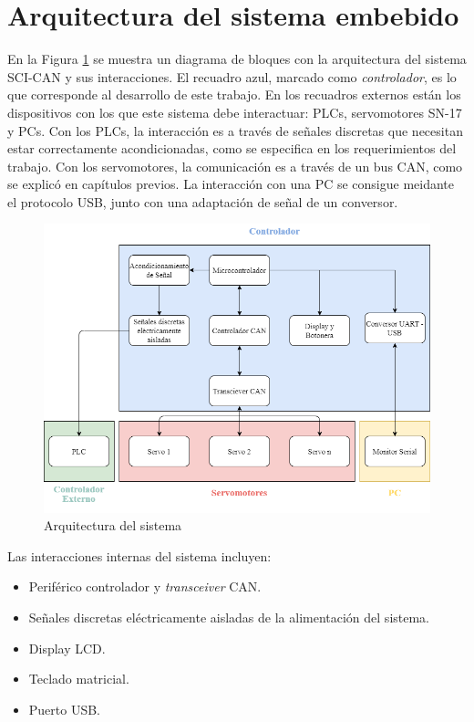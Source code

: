 

\section{Arquitectura del sistema embebido}

En la Figura \ref{fig:arquitectura_sistema} se muestra un diagrama de bloques con la arquitectura del sistema SCI-CAN y sus interacciones. El recuadro azul, marcado como \textit{controlador}, es lo que corresponde al desarrollo de este trabajo. En los recuadros externos están los dispositivos con los que este sistema debe interactuar: PLCs, servomotores SN-17 y PCs. Con los PLCs, la interacción es a través de señales discretas que necesitan estar correctamente acondicionadas, como se especifica en los requerimientos del trabajo. Con los servomotores, la comunicación es a través de un bus CAN, como se explicó en capítulos previos. La interacción con una PC se consigue meidante el protocolo USB, junto con una adaptación de señal de un conversor.

\begin{figure}[htbp]
	\centering
	\includegraphics[scale=.5]{./Figures/Arquitectura_SE.png}
	\caption{Arquitectura del sistema}
	\label{fig:arquitectura_sistema}
\end{figure}

Las interacciones internas del sistema incluyen:
\begin{itemize}
	\item Periférico controlador y \textit{transceiver} CAN.
	\item Señales discretas eléctricamente aisladas de la alimentación del sistema.
	\item Display LCD.
	\item Teclado matricial.
	\item Puerto USB.
\end{itemize}

